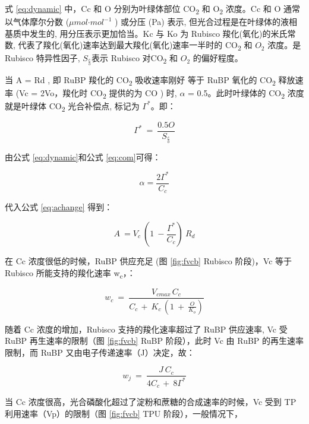 \documentclass[
]{krantz}
\begin{document}
式 \eqref{eq:dynamic} 中，Cc 和 O 分别为叶绿体部位 CO\textsubscript{2} 和 O\textsubscript{2} 浓度。Cc 和
O 通常以气体摩尔分数 (\(\mu mol\text{·}mol^{-1}\) ) 或分压 (Pa) 表示, 但光合过程是在叶绿体的液相基质中发生的,
用分压表示更加恰当。Kc 与 Ko 为 Rubisco 羧化(氧化)的米氏常数, 代表了羧化(氧化)速率达到最大羧化(氧化)速率一半时的
CO\textsubscript{2} 和 \(O_{2}\) 浓度。是 Rubisco 特异性因子, \(S_{\frac{c}{o}}\)表示 Rubisco
对CO\textsubscript{2} 和 \(O_{2}\) 的偏好程度。

当 A = Rd , 即 RuBP 羧化的 CO\textsubscript{2} 吸收速率刚好 等于 RuBP 氧化的 CO\textsubscript{2} 释放速率
(Vc = 2Vo，羧化时 CO\textsubscript{2} 提供的为 CO ) 时, \(\alpha\) = 0.5。此时叶绿体的 CO\textsubscript{2} 浓度就是叶绿体 CO\textsubscript{2}
光合补偿点, 标记为 \(\Gamma^{*}\)。即：

\begin{equation}
\Gamma^{*}\ =\ \frac{0.5O}{S_{\frac{c}{o}}}
\label{eq:com}
\end{equation}

由公式 \eqref{eq:dynamic}和公式 \eqref{eq:com}可得：

\begin{equation}
\alpha =\frac{2\Gamma^{*}}{C_{c}}
\label{eq:combine}
\end{equation}

代入公式 \eqref{eq:achange} 得到：

\begin{equation}
A\ =V_{c}\ (1\ -\frac{\Gamma^{*}}{C_{c}})\ R_{d}
\label{eq:combine2}
\end{equation}

在 Cc 浓度很低的时候，RuBP 供应充足 (图 \ref{fig:fvcb} Rubisco 阶段)，Vc 等于 Rubisco
所能支持的羧化速率 w\textsubscript{c}，：

\begin{equation}
w_{c}\ =\ \frac{V_{cmax\ }C_{c}}{C_{c\ }+\ K_{c\ }(1\ +\ \frac{O}{K_{o}})}
\label{eq:wc}
\end{equation}

随着 Cc 浓度的增加，Rubisco 支持的羧化速率超过了 RuBP 供应速率, Vc 受 RuBP 再生速率的限制（图 \ref{fig:fvcb}
RuBP 阶段），此时 Vc 由 RuBP 的再生速率限制，而 RuBP 又由电子传递速率（J）决定，故：

\begin{equation}
w_{j}\ =\ \frac{J\ C_{c}}{4C_{c\ }+\ 8\Gamma^{*}}
\label{eq:wj}
\end{equation}

当 Cc 浓度很高，光合磷酸化超过了淀粉和蔗糖的合成速率的时候，Vc 受到 TP 利用速率（Vp）的限制（图 \ref{fig:fvcb}
TPU 阶段），一般情况下，
\end{document}
